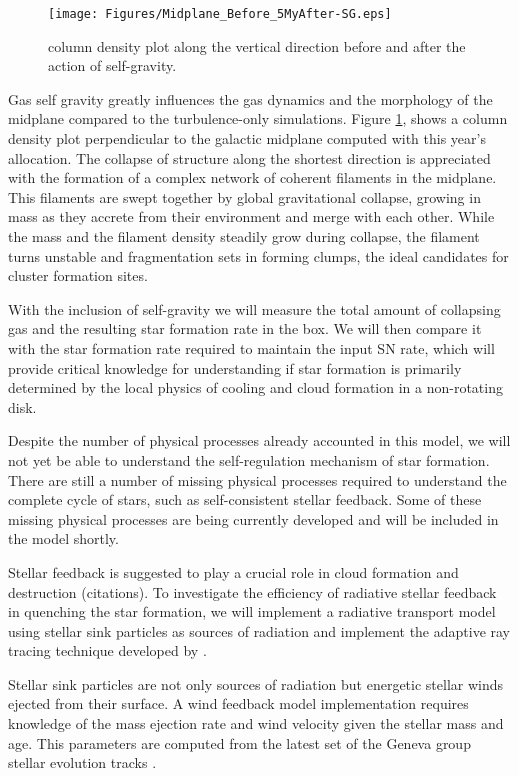 \documentclass[12pt,a4paper]{article}
\begin{document}
\begin{figure}
	\texttt{[image: Figures/Midplane\_Before\_5MyAfter-SG.eps]} 	
	\caption{column density plot along the vertical direction before and after the action of self-gravity.}
	\label{midplane_nosg_sg}
\end{figure}
	
Gas self gravity greatly influences the gas dynamics and the morphology of the midplane compared to the turbulence-only simulations.
Figure \ref{midplane_nosg_sg}, shows a column density plot perpendicular to the galactic midplane computed with this year's allocation.
The collapse of structure along the shortest direction is appreciated with the formation of a complex network of coherent filaments in the midplane.
This filaments are swept together by global gravitational collapse, growing in mass as they accrete from their environment and merge with each other.
While the mass and the filament density steadily grow during collapse, the filament turns unstable and fragmentation sets in forming clumps, the ideal candidates for cluster formation sites.
	
With the inclusion of self-gravity we will measure the total amount of collapsing gas and the resulting star formation rate in the box.
We will then compare it with the star formation rate required to maintain the input SN rate, which will provide critical knowledge for understanding if star formation is primarily determined by the local physics of cooling and cloud formation in a non-rotating disk.
	
Despite the number of physical processes already accounted in this model, we will not yet be able to understand the self-regulation mechanism of star formation.
There are still a number of missing physical processes required to understand the complete cycle of stars, such as self-consistent stellar feedback. 
Some of these missing physical processes are being currently developed and will be included in the model shortly. 

Stellar feedback is suggested to play a crucial role in cloud formation and destruction (citations). 
To investigate the efficiency of radiative stellar feedback in quenching the star formation, we will implement a radiative transport model using stellar sink particles as sources of radiation and implement the adaptive ray tracing technique developed by \citet{Wise&Abel2011}.
	
Stellar sink particles are not only sources of radiation but energetic stellar winds ejected from their surface. 
A wind feedback model implementation requires knowledge of the mass ejection rate and wind velocity given the stellar mass and age.
This parameters are computed from the latest set of the Geneva group stellar evolution tracks \citet{Ekstrom2012, Georgy2012, Georgy2013}.
\end{document}
